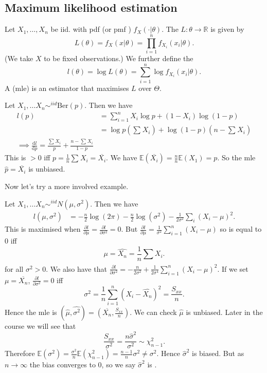 \documentclass[a4paper]{scrartcl}
\begin{document}
\subsection{Maximum likelihood estimation}
\begin{definition*}
     Let $X_1 , \ldots ,X_n $ be iid. with pdf (or pmf ) $f_{X}(\cdot | \theta)$. The  $L: \theta \rightarrow \mathbb{R}$ is given by \[
     L (\theta)=f_{X}(x| \theta)=\prod_{i=1}^n f_{X_i}(x_{i}| \theta)
     .\] (We take $X$ to be fixed observations.) We further define the  \[
     l (\theta)=\log L (\theta)=\sum_{i=1}^{n}\log f_{X_i}(x_{i}| \theta)
     .\]A  (mle) is an estimator that maximises $L$ over $\Theta$.
\end{definition*}
\begin{example*}
      Let $X_1 , \ldots X_n \sim^{iid} $Ber$(p)$. Then we have
      \begin{align*}
          l (p)&=\sum_{i=1}^{n }X_{i} \log p+ (1-X_i) \log (1-p)\\
          &=\log p (\sum_{}^{}X_{i})+\log (1-p)(n-\sum_{}^{}X_i)\\
          \implies \frac{\mathrm{d}l}{\mathrm{d}p}= \frac{\sum_{}^{}X_i}{p}+ \frac{n-\sum_{}^{}X_i}{1-p}
      \end{align*}
      This is $>0$ iff $p=\frac{1}{n}\sum_{}^{}X_i= \overline{X_i}$. We have $\mathbb{E} (\overline{X_i})=\frac{n}{n}\mathbb{E} (X_1 )=p$. So the mle $\hat{p} =\overline{X_i}$ is unbiased.
\end{example*}
Now let's try a more involved example.
\begin{example*}
      Let $X_1 , \ldots X_n \sim^{iid} N(\mu, \sigma^2)$. Then we have
      \begin{align*}
           l (\mu, \sigma^2)&=-\frac{n}{2}\log ( 2\pi)-\frac{n}{2 }\log (\sigma^2)-\frac{1}{2\sigma^2 }\sum_{i}^{}(X_i-\mu)^2.
      \end{align*}
      This is maximised when $\frac{\partial l}{\partial \mu}=\frac{\partial l}{\partial \sigma^2}=0$. But $\frac{\partial l}{\partial \mu}=\frac{1}{\sigma^2}\sum_{i=1}^{n}(X_i-\mu)$ so is equal to 0 iff \[
      \mu=\hat{X_n}=\frac{1}{n}\sum_{}^{}X_i
      .\] for all $\sigma^2 >0$.
      We also have that $\frac{\partial l}{\partial \sigma^2}=-\frac{n}{2\sigma^2}+\frac{1}{2\sigma^4} \sum_{i=1}^{n}(X_i-\mu)^2$.
      If we set $\mu=\overline{X_n}$, $\frac{\partial l}{\partial \sigma^2}=0$ iff \[
      \sigma^2= \frac{1}{n} \sum_{i=1}^{n}(X_i-\hat{X_n})^2= \frac{S_{xx}}{n}
      .\] Hence the mle is $(\hat{\mu},\hat{\sigma^2})=(\overline{X_n},\frac{S_{xx}}{n}) $. We can check $\hat{\mu}$ is unbiased. Later in the course we will see that \[
          \frac{S_{xx}}{\sigma^2}=\frac{n \hat{\sigma}^2}{\sigma^2} \sim \chi_{n-1}^2
      .\] Therefore $\mathbb{E} (\sigma^2)= \frac{\sigma^2}{n}\mathbb{E}(\chi_{n-1}^2)= \frac{n-1}{n}\sigma^2 \neq \sigma^2.$ Hence $\hat{\sigma}^2$ is biased. But as $n \rightarrow \infty$ the bias converges to 0, so we say $\hat{\sigma}^2$ is . 
\end{example*}
\end{document}
